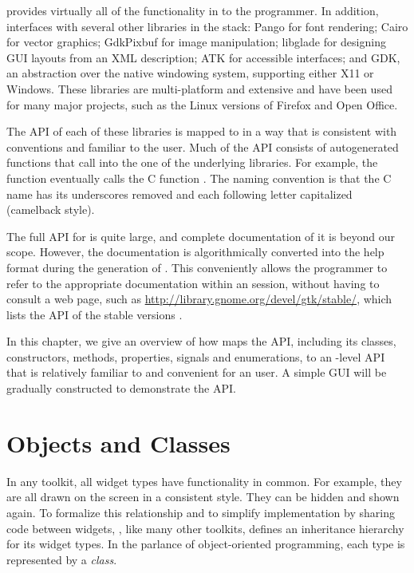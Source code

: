  provides virtually all of the functionality in \GTK\/ to
the \R\/ programmer. In addition,  interfaces with several
other libraries in the \GTK\/ stack: Pango for font rendering; Cairo
for vector graphics; GdkPixbuf for image manipulation; libglade for
designing GUI layouts from an XML description; ATK for accessible
interfaces; and GDK, an abstraction over the native windowing system,
supporting either X11 or Windows. These libraries are multi-platform
and extensive and have been used for many major projects, such as the
Linux versions of Firefox and Open Office.

The API of each of these libraries is mapped to \R\/ in a way that is
consistent with \R\/ conventions and familiar to the \R\/
user. Much of the  API consists of autogenerated \R\/
functions that call into the one of the underlying libraries. For
example, the \R\/ function  eventually calls
the C function . The naming convention is
that the C name has its underscores removed and each following letter
capitalized (camelback style).

The full API for \GTK\/ is quite large, and complete documentation of
it is beyond our scope. However, the \GTK\/ documentation is
algorithmically converted into the \R\/ help format during the
generation of . This conveniently allows the programmer to
refer to the appropriate documentation within an \R\/ session, without
having to consult a web page, such as
\url{http://library.gnome.org/devel/gtk/stable/}, which lists the
 API of the stable versions \GTK.

In this chapter, we give an overview of how  maps the
\GTK\/ API, including its classes, constructors, methods, properties,
signals and enumerations, to an \R-level API that is relatively
familiar to and convenient for an \R\/ user. A simple GUI will be
gradually constructed to demonstrate the API.


\section{Objects and Classes}

In any toolkit, all widget types have functionality in common. For
example, they are all drawn on the screen in a consistent style. They
can be hidden and shown again. To formalize this relationship and to
simplify implementation by sharing code between widgets, ,
like many other toolkits, defines an inheritance hierarchy for its
widget types. In the parlance of object-oriented programming, each
type is represented by a \textit{class}.

